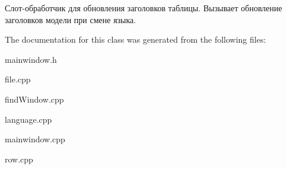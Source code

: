 Слот-\/обработчик для обновления заголовков таблицы. Вызывает обновление заголовков модели при смене языка. 

The documentation for this class was generated from the following files\+:\begin{DoxyCompactItemize}
\item 
mainwindow.\+h\item 
file.\+cpp\item 
find\+Window.\+cpp\item 
language.\+cpp\item 
mainwindow.\+cpp\item 
row.\+cpp\end{DoxyCompactItemize}
